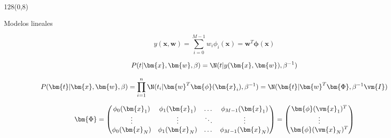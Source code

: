 \documentclass[shownotes]{beamer}
\begin{document}
\begin{frame}
\begin{textblock}{128}(0,8)
\begin{center}
 \large Modelos lineales
\end{center}
\end{textblock}
 \vspace{0.75cm}
 
\begin{equation*}
y(\bm{x},\bm{w}) = \sum_{i=0}^{M-1} w_i \phi_i(\bm{x}) = \bm{w}^T \bm{\phi}(\bm{x})
\end{equation*}

\vspace{0.5cm}
\pause
% 
 
 \begin{equation*}
P(t | \bm{x}, \bm{w}, \beta) = \N(t | y(\bm{x},\bm{w}) , \beta^{-1})
\end{equation*}
\vspace{0.025cm}
\pause
 
\begin{equation*}
P(\bm{t} | \bm{x}, \bm{w}, \beta) = \prod_{i=1}^n \N(t_i | \bm{w}^T \bm{\phi}(\bm{x}_i) , \beta^{-1}) = \N(\bm{t}|\bm{w}^T \bm{\Phi}, \beta^{-1} \vm{I})
\end{equation*}
\vspace{0.05cm}
\pause

\begin{equation*}
 \bm{\Phi} =
  \begin{pmatrix}
    \phi_0(\bm{x}_1) & \phi_1(\bm{x}_1) & \dots & \phi_{M-1}(\bm{x}_1)\\
    \vdots & \vdots & \ddots & \vdots \\
    \phi_0(\bm{x}_N) & \phi_1(\bm{x}_N) & \dots & \phi_{M-1}(\bm{x}_N)
  \end{pmatrix}
  = 
  \begin{pmatrix}
   \bm{\phi}(\vm{x}_1)^T \\
   \vdots \\
   \bm{\phi}(\vm{x}_N)^T \\
  \end{pmatrix}
\end{equation*}

 
\end{frame}
\end{document}
